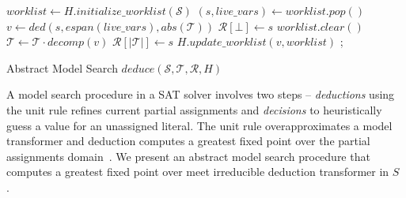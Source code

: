 \begin{algorithm2e}[t]
\DontPrintSemicolon
{}
\begin{small}
$\mathit{worklist} \leftarrow H.\mathit{initialize\_worklist}(\mathcal{S})$ \;
{
  $(s,\mathit{live\_vars}) \leftarrow \mathit{worklist.pop}()$ \;
  $v \leftarrow ded(s, \mathit{espan}(\mathit{live\_vars}), \mathit{abs}(\mathcal{T}))$\;
   {
    $\mathcal{R}[\bot] \leftarrow s$ \;
    $\mathit{worklist.clear}()$ \;
    \return \conflict \;
  }
  \uElse
  {
    $\mathcal{T} \leftarrow \mathcal{T} \cdot \mathit{decomp}(v)$ \; 
    $\mathcal{R}[|\mathcal{T}|] \leftarrow s$ \;
    $H.\mathit{update\_worklist}(v, \mathit{worklist})$ \; 
  }
}
 {
  \return \sat;
}
 \return \unknown \;

\end{small}
\caption{Abstract Model Search $\mathit{deduce}(\mathcal{S},\mathcal{T},\mathcal{R},H)$ \label{Alg:ms}}
\end{algorithm2e}
%  
A model search procedure in a SAT solver involves two steps -- {\em deductions} 
using the unit rule refines current partial assignments and 
{\em decisions} to heuristically guess a value for an unassigned 
literal.  The unit rule overapproximates a model transformer and deduction 
computes a greatest fixed point over the partial assignments
domain~\cite{dhk2013-popl}.  We present an abstract model search procedure 
that computes a greatest fixed point over meet irreducible deduction 
transformer in $S$ .  
%

